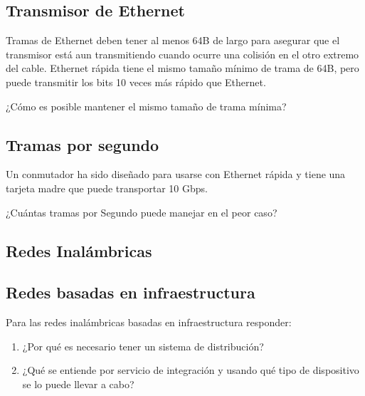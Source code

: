 \documentclass[12pt]{report}
\begin{document}
\begin{exer}
	\subsection{Transmisor de Ethernet \stwo \steo}
	Tramas de Ethernet deben tener al menos 64B de largo para asegurar que el transmisor está aun transmitiendo cuando ocurre una colisión en el otro extremo del cable. Ethernet rápida tiene el mismo tamaño mínimo de trama de 64B, pero puede transmitir los bits 10 veces más rápido que Ethernet.

	¿Cómo es posible mantener el mismo tamaño de trama mínima?
\end{exer}

\begin{exer}
	\subsection{Tramas por segundo \stwo}
	Un conmutador ha sido diseñado para usarse con Ethernet rápida y tiene una tarjeta madre que puede transportar 10 Gbps.

	¿Cuántas tramas por Segundo puede manejar en el peor caso?
\end{exer}

\begin{exer}
	\section{Redes Inalámbricas}
	\subsection{Redes basadas en infraestructura \sthree \steo}
	Para las redes inalámbricas basadas en infraestructura responder:

	\begin{enumerate}
		\item ¿Por qué es necesario tener un sistema de distribución?
		\item ¿Qué se entiende por servicio de integración y usando qué tipo de dispositivo se lo puede llevar a cabo?
	\end{enumerate}
\end{exer}
\end{document}
